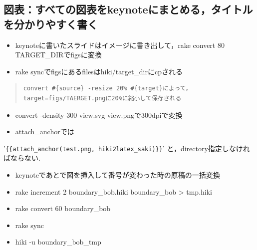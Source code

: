 \documentclass[12pt,a4paper]{jsarticle}
\begin{document}
\subsection{図表：すべての図表をkeynoteにまとめる，タイトルを分かりやすく書く}\begin{itemize}
\item keynoteに書いたスライドはイメージに書き出して，rake convert 80 TARGET\_DIRでfigsに変換
\item rake syncでfigsにあるfilesはhiki/target\_dirにcpされる
\end{itemize}\begin{quote}\begin{verbatim}
convert #{source} -resize 20% #{target}によって，target=figs/TAERGET.pngに20%に縮小して保存される
\end{verbatim}\end{quote}\begin{itemize}
\item convert -density 300 view.svg view.pngで300dpiで変換
\item attach\_anchorでは
\end{itemize}
'\verb|{{attach_anchor(test.png, hiki2latex_saki)}}|'
と，directory指定しなければならない.
\begin{itemize}
\item keynoteであとで図を挿入して番号が変わった時の原稿の一括変換
\item rake increment 2 boundary\_bob.hiki boundary\_bob > tmp.hiki
\item rake convert 60 boundary\_bob
\item rake sync
\item hiki -u boundary\_bob\_tmp
\end{itemize}
\end{document}
